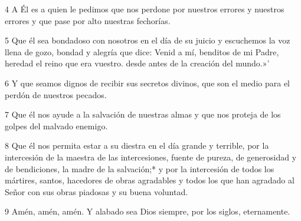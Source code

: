 \par 4 A Él es a quien le pedimos que nos perdone por nuestros errores y nuestros errores y que pase por alto nuestras fechorías.

\par 5 Que él sea bondadoso con nosotros en el día de su juicio y escuchemos la voz llena de gozo, bondad y alegría que dice: Venid a mí, benditos de mi Padre, heredad el reino que era vuestro. desde antes de la creación del mundo.»'

\par 6 Y que seamos dignos de recibir sus secretos divinos, que son el medio para el perdón de nuestros pecados.

\par 7 Que él nos ayude a la salvación de nuestras almas y que nos proteja de los golpes del malvado enemigo.

\par 8 Que él nos permita estar a su diestra en el día grande y terrible, por la intercesión de la maestra de las intercesiones, fuente de pureza, de generosidad y de bendiciones, la madre de la salvación;* y por la intercesión de todos los mártires, santos, hacedores de obras agradables y todos los que han agradado al Señor con sus obras piadosas y su buena voluntad.

\par 9 Amén, amén, amén. Y alabado sea Dios siempre, por los siglos, eternamente.

